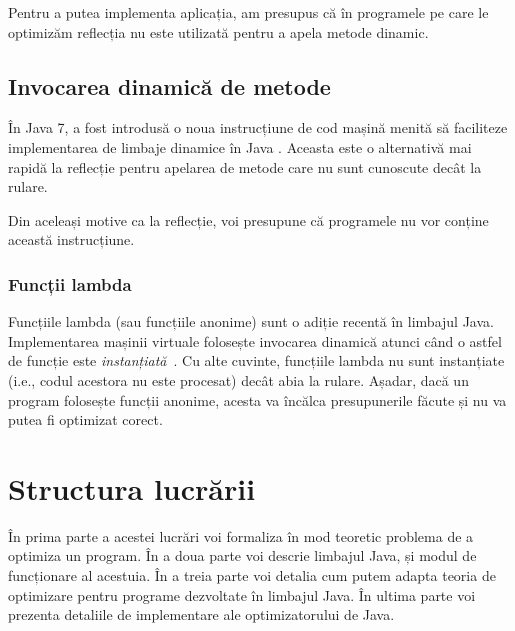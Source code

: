 Pentru a putea implementa aplicația, am presupus că în programele pe care le
optimizăm reflecția nu este utilizată pentru a apela metode dinamic.

\subsection{Invocarea dinamică de metode}

În Java 7, a fost introdusă o noua instrucțiune de cod mașină menită să
faciliteze implementarea de limbaje dinamice în Java \cite{java_invokedynamic}.
Aceasta este o alternativă mai rapidă la reflecție pentru apelarea de metode
care nu sunt cunoscute decât la rulare.

Din aceleași motive ca la reflecție, voi presupune că programele nu vor conține
această instrucțiune.

\subsubsection{Funcții lambda}

Funcțiile lambda (sau funcțiile anonime) sunt o adiție recentă în limbajul Java.
Implementarea mașinii virtuale folosește invocarea dinamică atunci când o astfel
de funcție este \textit{instanțiată}~\cite{jvm_lambdas}.
Cu alte cuvinte, funcțiile lambda nu sunt instanțiate (i.e., codul acestora nu
este procesat) decât abia la rulare.
Așadar, dacă un program folosește funcții anonime, acesta va încălca
presupunerile făcute și nu va putea fi optimizat corect.


\section{Structura lucrării}

În prima parte a acestei lucrări voi formaliza în mod teoretic
problema de a optimiza un program.
În a doua parte voi descrie limbajul Java, și modul de
funcționare al acestuia.
În a treia parte voi detalia cum putem adapta teoria de
optimizare pentru programe dezvoltate în limbajul Java.
În ultima parte voi prezenta detaliile de implementare ale
optimizatorului de Java.
